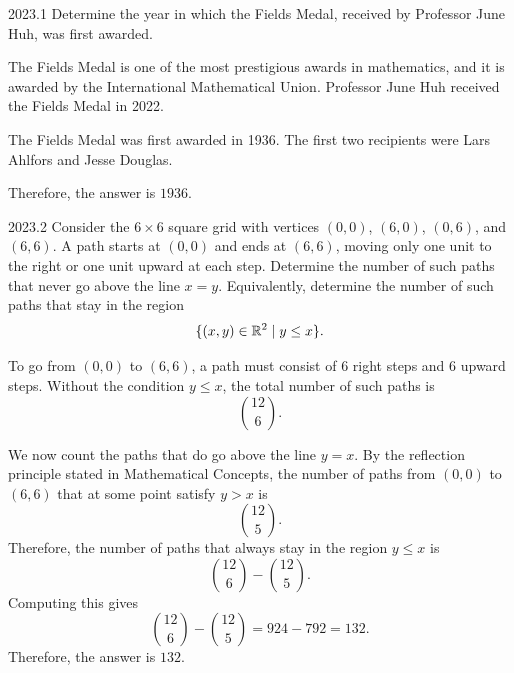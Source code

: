     \begin{pastproblem}{2023.1}
        Determine the year in which the Fields Medal, received by Professor June Huh, was first
        awarded.
    \end{pastproblem}

    \begin{solution}
        The Fields Medal is one of the most prestigious awards in mathematics, and it is awarded by
        the International Mathematical Union. Professor June Huh received the Fields Medal in 2022.

        The Fields Medal was first awarded in 1936. The first two recipients were Lars Ahlfors and
        Jesse Douglas.

        Therefore, the answer is $\boxed{1936}$.
    \end{solution}

    \begin{pastproblem}{2023.2}
        Consider the $6\times 6$ square grid with vertices $(0,0)$, $(6,0)$, $(0,6)$, and $(6,6)$. A
        path starts at $(0,0)$ and ends at $(6,6)$, moving only one unit to the right or one unit
        upward at each step. Determine the number of such paths that never go above the line $x=y$.
        Equivalently, determine the number of such paths that stay in the region
        \[
            \{(x,y)\in\mathbb{R}^2\mid y\leq x\}.
        \]
    \end{pastproblem}

    \begin{solution}
        To go from $(0,0)$ to $(6,6)$, a path must consist of $6$ right steps and $6$ upward steps.
        Without the condition $y\leq x$, the total number of such paths is
        \[
            \binom{12}{6}.
        \]

        We now count the paths that do go above the line $y=x$. By the reflection principle stated in Mathematical Concepts, the
        number of paths from $(0,0)$ to $(6,6)$ that at some point satisfy $y>x$ is
        \[
            \binom{12}{5}.
        \]
        Therefore, the number of paths that always stay in the region $y\leq x$ is
        \[
            \binom{12}{6}-\binom{12}{5}.
        \]
        Computing this gives
        \[
            \binom{12}{6}-\binom{12}{5}
            =
            924-792
            =
            132.
        \]
        Therefore, the answer is $\boxed{132}$.
    \end{solution}

